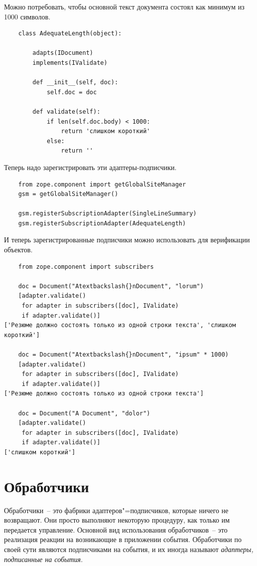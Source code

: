\documentclass[a4paper,openany,twoside,final]{book}
\providecommand*{\DUroletitlereference}[1]{\textsl{#1}}
\begin{document}
Можно потребовать, чтобы основной текст документа состоял как минимум
из 1000 символов.

\begin{verbatim}
    class AdequateLength(object):

        adapts(IDocument)
        implements(IValidate)

        def __init__(self, doc):
            self.doc = doc

        def validate(self):
            if len(self.doc.body) < 1000:
                return 'слишком короткий'
            else:
                return ''
\end{verbatim}

Теперь надо зарегистрировать эти адаптеры-подписчики.

\begin{verbatim}
    from zope.component import getGlobalSiteManager
    gsm = getGlobalSiteManager()

    gsm.registerSubscriptionAdapter(SingleLineSummary)
    gsm.registerSubscriptionAdapter(AdequateLength)
\end{verbatim}

И теперь зарегистрированные подписчики можно использовать для верификации объектов.

\begin{verbatim}
    from zope.component import subscribers

    doc = Document("Atextbackslash{}nDocument", "lorum")
    [adapter.validate()
     for adapter in subscribers([doc], IValidate)
     if adapter.validate()]
['Резюме должно состоять только из одной строки текста', 'слишком короткий']

    doc = Document("Atextbackslash{}nDocument", "ipsum" * 1000)
    [adapter.validate()
     for adapter in subscribers([doc], IValidate)
     if adapter.validate()]
['Резюме должно состоять только из одной строки текста']

    doc = Document("A Document", "dolor")
    [adapter.validate()
     for adapter in subscribers([doc], IValidate)
     if adapter.validate()]
['слишком короткий']
\end{verbatim}


\section{Обработчики%
  \label{id47}%
}

Обработчики~-- это фабрики адаптеров"=подписчиков, которые ничего не возвращают.  Они просто выполняют некоторую процедуру, как только им передается управление.  Основной вид использования обработчиков~-- это реализация реакции на возникающие в приложении события.  Обработчики по своей сути являются подписчиками на события, и их иногда называют \DUroletitlereference{адаптеры, подписанные на события}.
\end{document}
